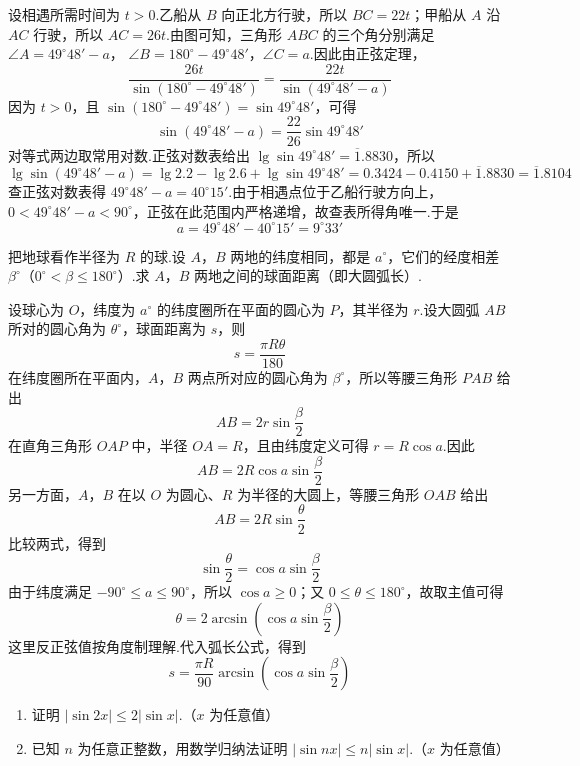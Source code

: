 \documentclass[UTF8,a4paper,oneside,11pt]{ctexbook}
\begin{document}
\begin{solution}
设相遇所需时间为 \(t>0\).乙船从 \(B\) 向正北方行驶，所以 \(BC=22t\)；甲船从 \(A\) 沿 \(AC\) 行驶，所以 \(AC=26t\).由图可知，三角形 \(ABC\) 的三个角分别满足 \(\angle A=49^\circ48'-a\)，
\(\angle B=180^\circ-49^\circ48'\)，\(\angle C=a\).因此由正弦定理，
\[
\frac{26t}{\sin(180^\circ-49^\circ48')}=\frac{22t}{\sin(49^\circ48'-a)}
\]
因为 \(t>0\)，且 \(\sin(180^\circ-49^\circ48')=\sin49^\circ48'\)，可得
\[
\sin(49^\circ48'-a)=\frac{22}{26}\sin49^\circ48'
\]
对等式两边取常用对数.正弦对数表给出 \(\lg\sin49^\circ48'=\overline{1}.8830\)，所以
\[
\lg\sin(49^\circ48'-a)=\lg2.2-\lg2.6+\lg\sin49^\circ48'=0.3424-0.4150+\overline{1}.8830=\overline{1}.8104
\]
查正弦对数表得 \(49^\circ48'-a=40^\circ15'\).由于相遇点位于乙船行驶方向上，\(0<49^\circ48'-a<90^\circ\)，正弦在此范围内严格递增，故查表所得角唯一.于是
\[
a=49^\circ48'-40^\circ15'=9^\circ33'
\]
\end{solution}

\begin{problem}
把地球看作半径为 \(R\) 的球.设 \(A\)，\(B\) 两地的纬度相同，都是 \(a^\circ\)，它们的经度相差 \(\beta^\circ\)（\(0^\circ<\beta\leq180^\circ\)）.求 \(A\)，\(B\) 两地之间的球面距离（即大圆弧长）.

\end{problem}

\begin{solution}
设球心为 \(O\)，纬度为 \(a^\circ\) 的纬度圈所在平面的圆心为 \(P\)，其半径为 \(r\).设大圆弧 \(AB\) 所对的圆心角为 \(\theta^\circ\)，球面距离为 \(s\)，则
\[
s=\frac{\pi R\theta}{180}
\]
在纬度圈所在平面内，\(A\)，\(B\) 两点所对应的圆心角为 \(\beta^\circ\)，所以等腰三角形 \(PAB\) 给出
\[
AB=2r\sin\frac{\beta}{2}
\]
在直角三角形 \(OAP\) 中，半径 \(OA=R\)，且由纬度定义可得 \(r=R\cos a\).因此
\[
AB=2R\cos a\sin\frac{\beta}{2}
\]
另一方面，\(A\)，\(B\) 在以 \(O\) 为圆心、\(R\) 为半径的大圆上，等腰三角形 \(OAB\) 给出
\[
AB=2R\sin\frac{\theta}{2}
\]
比较两式，得到
\[
\sin\frac{\theta}{2}=\cos a\sin\frac{\beta}{2}
\]
由于纬度满足 \(-90^\circ\leq a\leq90^\circ\)，所以 \(\cos a\geq0\)；又 \(0\leq\theta\leq180^\circ\)，故取主值可得
\[
\theta=2\arcsin\left(\cos a\sin\frac{\beta}{2}\right)
\]
这里反正弦值按角度制理解.代入弧长公式，得到
\[
s=\frac{\pi R}{90}\arcsin\left(\cos a\sin\frac{\beta}{2}\right)
\]

\end{solution}

\begin{problem}
\begin{enumerate}
\item 证明 \( |\sin2x|\leq2|\sin x| \).（\(x\) 为任意值）
\item 已知 \(n\) 为任意正整数，用数学归纳法证明 \( |\sin nx|\leq n|\sin x| \).（\(x\) 为任意值）
\end{enumerate}
\end{problem}
\end{document}
